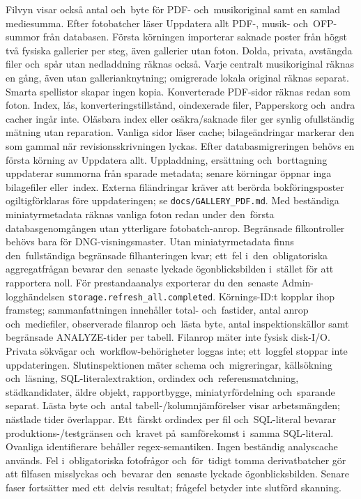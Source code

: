 \documentclass[11pt,a4paper]{article}
\newcommand{\codeword}[1]{\nolinkurl{#1}}
\begin{document}
Filvyn visar också antal och~byte för PDF- och~musikoriginal samt en
samlad mediesumma. Efter fotobatcher läser Uppdatera allt PDF-, musik-
och~OFP-summor
från databasen. Första körningen importerar saknade poster från högst två
fysiska
gallerier per steg, även gallerier utan foton. Dolda, privata, avstängda
filer och~spår utan nedladdning räknas också. Varje centralt musikoriginal
räknas
en gång, även utan gallerianknytning; omigrerade lokala original räknas separat.
Smarta spellistor skapar ingen kopia. Konverterade PDF-sidor räknas redan som
foton.
Index, lås, konverteringstillstånd, oindexerade filer, Papperskorg
och~andra cacher ingår inte. Oläsbara index eller osäkra/saknade filer ger
synlig ofullständig mätning utan reparation. Vanliga sidor läser cache;
bilageändringar markerar den som gammal när revisionsskrivningen lyckas.
Efter databasmigreringen behövs en första körning av Uppdatera allt.
Uppladdning, ersättning och~borttagning uppdaterar summorna från sparade
metadata;
senare körningar öppnar inga bilagefiler eller~index. Externa filändringar
kräver
att berörda bokföringsposter ogiltigförklaras före uppdateringen; se
\codeword{docs/GALLERY\_PDF.md}.
Med beständiga miniatyrmetadata räknas vanliga foton redan under den~första
databasgenomgången utan ytterligare fotobatch-anrop. Begränsade filkontroller
behövs bara för DNG-visningsmaster. Utan miniatyrmetadata finns den~fullständiga
begränsade filhanteringen kvar; ett~fel i~den~obligatoriska aggregatfrågan
bevarar
den~senaste lyckade ögonblicksbilden i~stället för att rapportera noll.
För prestandaanalys exporterar du den~senaste Admin-logghändelsen
\codeword{storage.refresh\_all.completed}. Körnings-ID:t kopplar ihop framsteg;
sammanfattningen innehåller total- och~fastider, antal anrop och~mediefiler,
observerade filanrop och~lästa byte, antal inspektionskällor samt begränsade
ANALYZE-tider per tabell. Filanrop mäter inte fysisk disk-I/O. Privata sökvägar
och~workflow-behörigheter loggas inte; ett~loggfel stoppar inte uppdateringen.
Slutinspektionen mäter schema och~migreringar, källsökning och~läsning,
SQL-literalextraktion, ordindex och~referensmatchning, städkandidater, äldre
objekt,
rapportbygge, miniatyrfördelning och~sparande separat. Lästa byte och~antal
tabell-/kolumnjämförelser visar arbetsmängden; nästlade tider överlappar.
Ett~färskt ordindex per fil och~SQL-literal bevarar produktions-/testgränsen
och~kravet på~samförekomst i~samma SQL-literal. Ovanliga identifierare behåller
regex-semantiken. Ingen beständig analyscache används.
Fel i~obligatoriska fotofrågor och~för~tidigt tomma derivatbatcher gör att
filfasen misslyckas och~bevarar den~senaste lyckade ögonblicksbilden.
Senare faser fortsätter med ett~delvis resultat; frågefel betyder inte slutförd
skanning.
\end{document}
